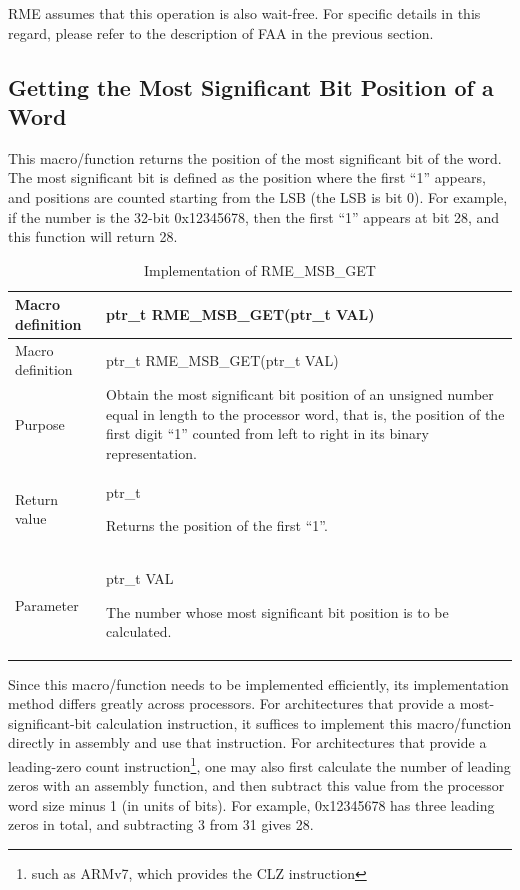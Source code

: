 RME assumes that this operation is also wait-free. For specific details in this regard, please refer to the description of FAA in the previous section.

\newpage
\subsection{Getting the Most Significant Bit Position of a Word}\label{subsec:7-get-msb-position-of-word}

This macro/function returns the position of the most significant bit of the word. The most significant bit is defined as the position where the first ``1'' appears, and positions are counted starting from the LSB (the LSB is bit 0). For example, if the number is the 32-bit 0x12345678, then the first ``1'' appears at bit 28, and this function will return 28.

\begin{xltabular}{\textwidth}{@{}>{\hsize\raggedright\arraybackslash}X>{\hsize\raggedright\arraybackslash}X@{}}
\caption{Implementation of RME\_MSB\_GET}\label{tab:7-34-rme-msb-get-implementation}\\
\toprule
Macro definition & ptr\_t RME\_MSB\_GET(ptr\_t VAL)\tabularnewline
\endfirsthead
\toprule
Macro definition & ptr\_t RME\_MSB\_GET(ptr\_t VAL)\tabularnewline
\midrule
\endhead
\bottomrule
\endlastfoot
Purpose &
Obtain the most significant bit position of an unsigned number equal in length to the processor word, that is, the position of the first digit ``1'' counted from left to right in its binary representation.\tabularnewline
Return value\strut
 & ptr\_t

Returns the position of the first ``1''.\strut
\tabularnewline
Parameter\strut
 & ptr\_t VAL

The number whose most significant bit position is to be calculated.\strut
\tabularnewline
\end{xltabular}
\nopagebreak[4]

Since this macro/function needs to be implemented efficiently, its implementation method differs greatly across processors. For architectures that provide a most-significant-bit calculation instruction, it suffices to implement this macro/function directly in assembly and use that instruction. For architectures that provide a leading-zero count instruction\footnote{such as ARMv7, which provides the CLZ instruction}, one may also first calculate the number of leading zeros with an assembly function, and then subtract this value from the processor word size minus 1 (in units of bits). For example, 0x12345678 has three leading zeros in total, and subtracting 3 from 31 gives 28.

